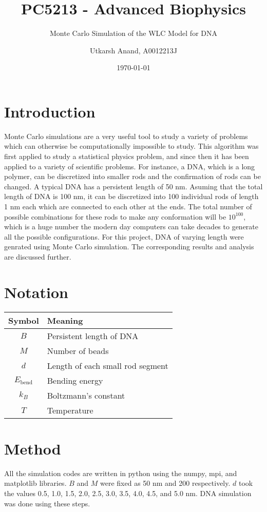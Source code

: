 \documentclass{scrartcl}
\author{Utkarsh Anand, A0012213J}
\title{PC5213 - Advanced Biophysics}
\subtitle{Monte Carlo Simulation of the WLC Model for DNA}
\date{\today}
\begin{document}
\maketitle

\section{Introduction}
\label{introduction}
Monte Carlo simulations are a very useful tool to study a variety of problems which can otherwise be computationally impossible to study. This algorithm was first applied to study a statistical physics problem, and since then it has been applied to a variety of scientific problems. For instance, a DNA, which is a long polymer, can be discretized into smaller rods and the confirmation of rods can be changed. A typical DNA has a persistent length of 50 nm. Asuming that the total length of DNA is 100 nm, it can be discretized into 100 individual rods of length 1 nm each which are connected to each other at the ends. The total number of possible combinations for these rods to make any conformation will be $10^{100}$, which is a huge number the modern day computers can take decades to generate all the possible configurations. For this project, DNA of varying length were genrated using Monte Carlo simulation. The corresponding results and analysis are discussed further.

\section{Notation}
\label{notation}
\begin{tabular}{|c|l|}
\hline
\textbf{Symbol} & \textbf{Meaning}\\
\hline
$B$ & Persistent length of DNA\\
$M$ & Number of beads\\
$d$ & Length of each small rod segment\\
$E_{\textrm{bend}}$ & Bending energy\\
$k_B$ & Boltzmann's constant\\
$T$ & Temperature\\
\hline
\end{tabular}

\section{Method}
\label{method}
All the simulation codes are written in python using the numpy, mpi, and matplotlib libraries. $B$ and $M$ were fixed as 50 nm and 200 respectively. $d$ took the values 0.5, 1.0, 1.5, 2.0, 2.5, 3.0, 3.5, 4.0, 4.5, and 5.0 nm. DNA simulation was done using these steps.
\end{document}
